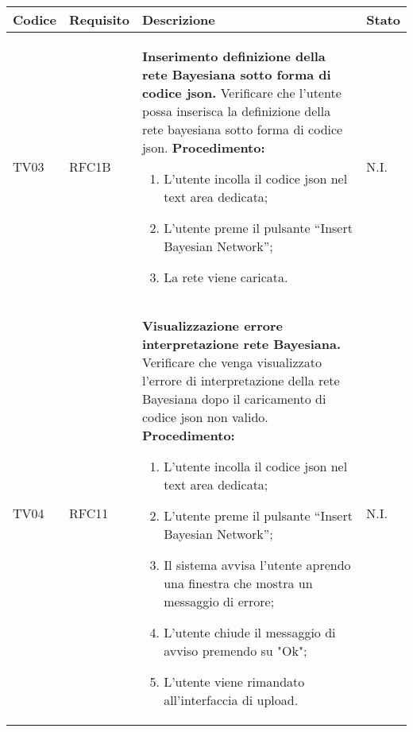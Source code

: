 \begin{table}[!htpb]
	\centering
	\renewcommand{\arraystretch}{2} 
	\begin{tabular}{|l|l|p{10cm}|l|}
		\rowcolor{orange!50}
		\hline
		\textbf{Codice} & \textbf{Requisito}& \textbf{Descrizione} & \textbf{Stato}\\ 
		\hline
		TV03 & RFC1B 	& 
			\textbf{Inserimento definizione della rete Bayesiana sotto forma di codice json.} 
			\newline
			Verificare che l'utente possa inserisca la definizione della rete bayesiana sotto forma di codice json. 
			\newline 
			\textbf{Procedimento:} 
			\begin{enumerate} 
				\item L’utente incolla il codice json nel text area dedicata; 
				\item L’utente preme il pulsante “Insert Bayesian Network”; 
				\item La rete viene caricata. 
			\end{enumerate} 
			& N.I.\\
		\hline
		TV04 & RFC11 	& 
			\textbf{Visualizzazione errore interpretazione rete Bayesiana.} 
			\newline
			Verificare che venga visualizzato l'errore di interpretazione della rete Bayesiana dopo il caricamento di codice json non valido. 
			\newline 
			\textbf{Procedimento:} 
			\begin{enumerate} 
				\item L’utente incolla il codice json nel text area dedicata; 
				\item L’utente preme il pulsante “Insert Bayesian Network”; 
				\item Il sistema avvisa l'utente aprendo una finestra che mostra un messaggio di errore; 
				\item L'utente chiude il messaggio di avviso premendo su "Ok"; 
				\item L'utente viene rimandato all'interfaccia di upload. 
			\end{enumerate} 
			& N.I.\\
		\hline
	\end{tabular}
\end{table}
